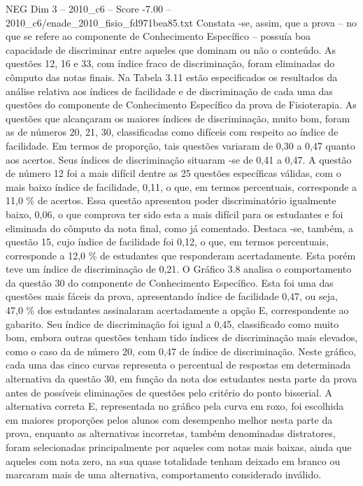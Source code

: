 \begin{textsample}{NEG Dim 3 – 2010\_c6 – Score -7.00 – 2010\_c6/enade\_2010\_fisio\_fd971bea85.txt}
Constata -se, assim, que a prova – no que se refere ao componente de Conhecimento Específico – possuía boa capacidade de discriminar entre aqueles que dominam ou não o conteúdo.
As questões 12, 16 e 33, com índice fraco de discriminação, foram eliminadas do cômputo das notas finais.
Na Tabela 3.11 estão especificados os resultados da análise relativa aos índices de facilidade e de discriminação de cada uma das questões do componente de Conhecimento Específico da prova de Fisioterapia.
As questões que alcançaram os maiores índices de discriminação, muito bom, foram as de números 20, 21, 30, classificadas como difíceis com respeito ao índice de facilidade.
Em termos de proporção, tais questões variaram de 0,30 a 0,47 quanto aos acertos.
Seus índices de discriminação situaram -se de 0,41 a 0,47.
A questão de número 12 foi a mais difícil dentre as 25 questões específicas válidas, com o mais baixo índice de facilidade, 0,11, o que, em termos percentuais, corresponde a 11,0 \% de acertos.
Essa questão apresentou poder discriminatório igualmente baixo, 0,06, o que comprova ter sido esta a mais difícil para os estudantes e foi eliminada do cômputo da nota final, como já comentado.
Destaca -se, também, a questão 15, cujo índice de facilidade foi 0,12, o que, em termos percentuais, corresponde a 12,0 \% de estudantes que responderam acertadamente.
Esta porém teve um índice de discriminação de 0,21.
O Gráfico 3.8 analisa o comportamento da questão 30 do componente de Conhecimento Específico.
Esta foi uma das questões mais fáceis da prova, apresentando índice de facilidade 0,47, ou seja, 47,0 \% dos estudantes assinalaram acertadamente a opção E, correspondente ao gabarito.
Seu índice de discriminação foi igual a 0,45, classificado como muito bom, embora outras questões tenham tido índices de discriminação mais elevados, como o caso da de número 20, com 0,47 de índice de discriminação.
Neste gráfico, cada uma das cinco curvas representa o percentual de respostas em determinada alternativa da questão 30, em função da nota dos estudantes nesta parte da prova antes de possíveis eliminações de questões pelo critério do ponto bisserial.
A alternativa correta E, representada no gráfico pela curva em roxo, foi escolhida em maiores proporções pelos alunos com desempenho melhor nesta parte da prova, enquanto as alternativas incorretas, também denominadas distratores, foram selecionadas principalmente por aqueles com notas mais baixas, ainda que aqueles com nota zero, na sua quase totalidade tenham deixado em branco ou marcaram mais de uma alternativa, comportamento considerado inválido.

\end{textsample}
